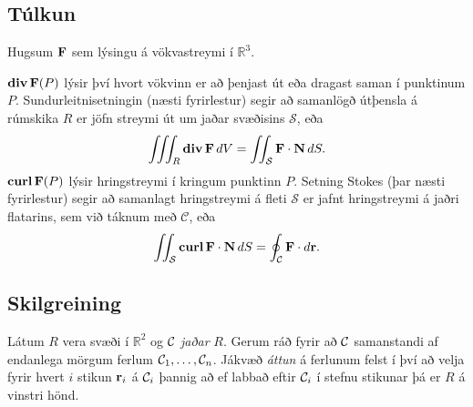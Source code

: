 \documentclass[a4paper,10pt,icelandic]{sphinxmanual}
\begin{document}
\subsection{Túlkun}
\label{Kafli6:tulkun}
Hugsum \(\mbox{${\bf F}$}\) sem lýsingu á vökvastreymi í
\({\mathbb  R}^3\).

\(\mbox{${\rm\bf div\,}$}\mbox{${\bf F}$}(P)\) lýsir því hvort
vökvinn er að þenjast út eða dragast saman í punktinum \(P\).
Sundurleitnisetningin (næsti fyrirlestur) segir að samanlögð útþensla á
rúmskika \(R\) er jöfn streymi út um jaðar svæðisins
\(\mathcal{S}\), eða
\begin{gather}
\begin{split}\displaystyle \int\!\!\!\int\!\!\!\int_R\mbox{${\rm\bf div\,}$}\mbox{${\bf F}$}\,dV=\int\!\!\!\int_{\mathcal{S}} \mbox{${\bf F}$}\cdot\mbox{${\bf N}$}\,dS.\end{split}\notag
\end{gather}
\(\mbox{${\rm\bf curl\,}$}\mbox{${\bf F}$}(P)\) lýsir hringstreymi í
kringum punktinn \(P\). Setning Stokes (þar næsti fyrirlestur) segir
að samanlagt hringstreymi á fleti \(\mathcal{S}\) er jafnt
hringstreymi á jaðri flatarins, sem við táknum með \(\mathcal{C}\),
eða
\begin{gather}
\begin{split}\displaystyle \int\!\!\!\int_{\cal S} \mbox{${\rm\bf curl\,}$}\mbox{${\bf F}$}\cdot\mbox{${\bf N}$}\,dS=\oint_\mathcal{C} \mbox{${\bf F}$}\cdot d\mbox{${\bf r}$}.\end{split}\notag
\end{gather}

\subsection{Skilgreining}
\label{Kafli6:id7}
Látum \(R\) vera svæði í \({\mathbb  R}^2\) og \(\cal C\)
\textit{jaðar} \(R\). Gerum ráð fyrir að \(\cal C\) samanstandi af endanlega mörgum ferlum \({\cal C}_1, \ldots, {\cal C}_n\). Jákvæð
\textit{áttun} á ferlunum felst í því að velja fyrir hvert \(i\) stikun \(\mbox{${\bf r}$}_i\) á \({\cal C}_i\) þannig að ef labbað eftir \({\cal C}_i\) í stefnu stikunar þá er \(R\) á vinstri hönd.

\end{document}
